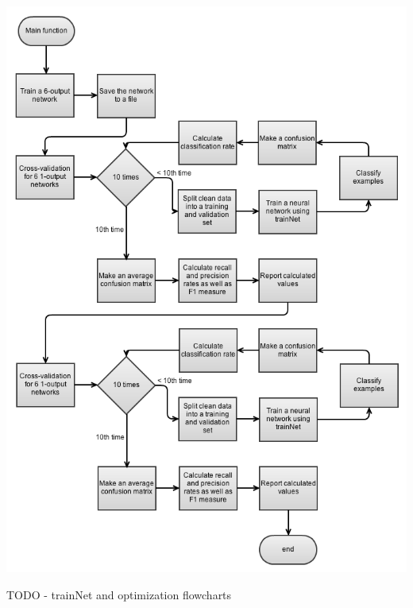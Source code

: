\documentclass[12pt]{article}
\begin{document}
\begin{center}
  \includegraphics[scale=0.7]{report-images/main.png}
\end{center}

TODO - trainNet and optimization flowcharts
\end{document}
